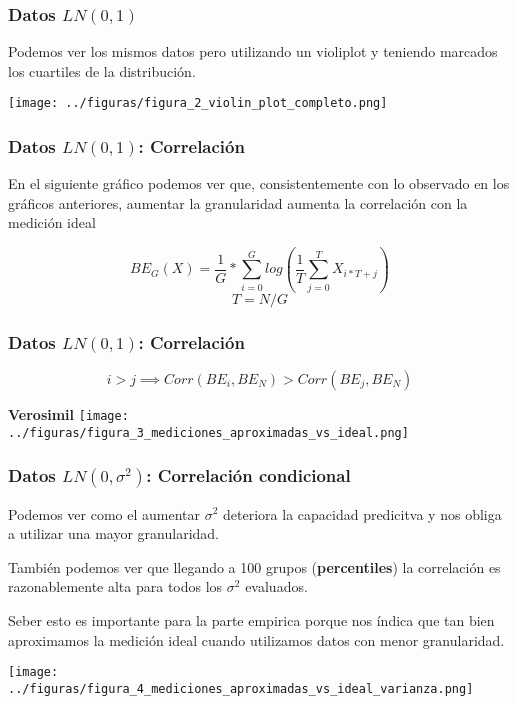 \documentclass[10pt,mathserif]{beamer}%
\begin{document}
\begin{frame}
    \frametitle{Datos $LN(0,1)$}
    \begin{multicols}{2}
        \begin{minipage}{\linewidth}
            Podemos ver los mismos datos pero utilizando un violiplot y teniendo marcados los cuartiles de la distribución.

        \end{minipage}

        \begin{minipage}{\linewidth}
            \centering
            \texttt{[image: ../figuras/figura\_2\_violin\_plot\_completo.png]} %
        \end{minipage}

    \end{multicols}
\end{frame}

\begin{frame}
    \frametitle{Datos $LN(0,1)$: Correlación}
    En el siguiente gráfico podemos ver que, consistentemente con lo observado en los gráficos anteriores, aumentar la granularidad aumenta la correlación con la medición ideal
    \begin{definition}[$BE_G$]
        $$ BE_G(X) = \frac{1}{G} * \sum_{i=0}^G log(\frac{1}{T} \sum_{j = 0}^{T} X_{i*T+j}) $$
        $$ T = N/G$$
    \end{definition}
\end{frame}

\begin{frame}
    \frametitle{Datos $LN(0,1)$: Correlación}
    \begin{conjecture}
        $$i>j \implies Corr(BE_i,BE_N) > Corr(BE_j,BE_N)$$ 
    \end{conjecture}
    \pause
    \textbf{Verosimil}
    \texttt{[image: ../figuras/figura\_3\_mediciones\_aproximadas\_vs\_ideal.png]} %
\end{frame}

\begin{frame}
    \frametitle{Datos $LN(0,\sigma^2)$: Correlación condicional}
    Podemos ver como el aumentar $\sigma^2$ deteriora la capacidad predicitva y nos obliga a utilizar una mayor granularidad.

    También podemos ver que llegando a 100 grupos (\textbf{percentiles}) la correlación es razonablemente alta para todos los $\sigma^2$ evaluados.

    Seber esto es importante para la parte empirica porque nos índica que tan bien aproximamos la medición ideal cuando utilizamos datos con menor granularidad.

    \texttt{[image: ../figuras/figura\_4\_mediciones\_aproximadas\_vs\_ideal\_varianza.png]} %

\end{frame}
\end{document}

